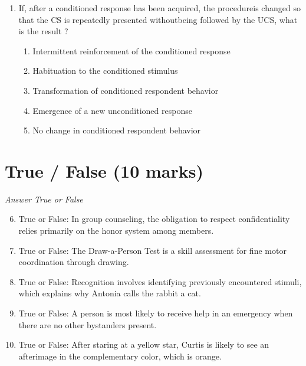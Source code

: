 \documentclass[12pt]{article}
\begin{document}
\begin{enumerate}[label=\arabic*.]
\begin{enumerate}[label=(\alph*)]
    \item symmetry
    \item complexity
    \item novelty
    \item similarity
    \item proximity
\end{enumerate}
\item If, after a conditioned response has been acquired, the procedureis changed so that the CS is repeatedly presented withoutbeing followed by the UCS, what is the result ?
\begin{enumerate}[label=(\alph*)]
    \item Intermittent reinforcement of the conditioned response
    \item Habituation to the conditioned stimulus
    \item Transformation of conditioned respondent behavior
    \item Emergence of a new unconditioned response
    \item No change in conditioned respondent behavior
\end{enumerate}
\end{enumerate}

\section*{True / False (10 marks)}
\textit{Answer True or False}
\begin{enumerate}[label=\arabic*.]
\setcounter{enumi}{5}
\item True or False: In group counseling, the obligation to respect confidentiality relies primarily on the honor system among members.
\item True or False: The Draw-a-Person Test is a skill assessment for fine motor coordination through drawing.
\item True or False: Recognition involves identifying previously encountered stimuli, which explains why Antonia calls the rabbit a cat.
\item True or False: A person is most likely to receive help in an emergency when there are no other bystanders present.
\item True or False: After staring at a yellow star, Curtis is likely to see an afterimage in the complementary color, which is orange.
\end{enumerate}
\end{document}
